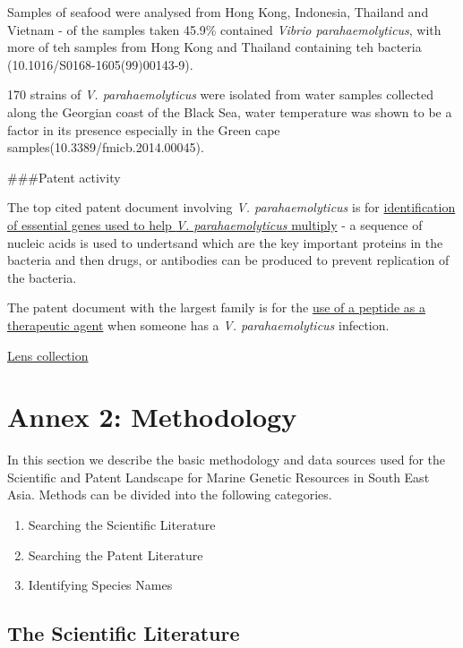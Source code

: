 \documentclass[]{book}
\providecommand{\tightlist}{%
  \setlength{\itemsep}{0pt}\setlength{\parskip}{0pt}}
\theoremstyle{definition}
\theoremstyle{definition}
\theoremstyle{definition}
\theoremstyle{remark}
\begin{document}
Samples of seafood were analysed from Hong Kong, Indonesia, Thailand and
Vietnam - of the samples taken 45.9\% contained \emph{Vibrio
parahaemolyticus}, with more of teh samples from Hong Kong and Thailand
containing teh bacteria (10.1016/S0168-1605(99)00143-9).

170 strains of \emph{V. parahaemolyticus} were isolated from water
samples collected along the Georgian coast of the Black Sea, water
temperature was shown to be a factor in its presence especially in the
Green cape samples(10.3389/fmicb.2014.00045).

\#\#\#Patent activity

The top cited patent document involving \emph{V. parahaemolyticus} is
for
\href{https://www.lens.org/lens/patent/US_2004_0029129_A1}{identification
of essential genes used to help \emph{V. parahaemolyticus} multiply} - a
sequence of nucleic acids is used to undertsand which are the key
important proteins in the bacteria and then drugs, or antibodies can be
produced to prevent replication of the bacteria.

The patent document with the largest family is for the
\href{https://www.lens.org/lens/patent/WO_2009_043477_A2}{use of a
peptide as a therapeutic agent} when someone has a \emph{V.
parahaemolyticus} infection.

\href{https://www.lens.org/lens/collection/24760}{Lens collection}

\hypertarget{method}{%
\chapter{Annex 2: Methodology}\label{method}}

In this section we describe the basic methodology and data sources used
for the Scientific and Patent Landscape for Marine Genetic Resources in
South East Asia. Methods can be divided into the following categories.

\begin{enumerate}
\def\labelenumi{\arabic{enumi}.}
\tightlist
\item
  Searching the Scientific Literature
\item
  Searching the Patent Literature
\item
  Identifying Species Names
\end{enumerate}

\hypertarget{the-scientific-literature}{%
\section{The Scientific Literature}\label{the-scientific-literature}}
\end{document}
